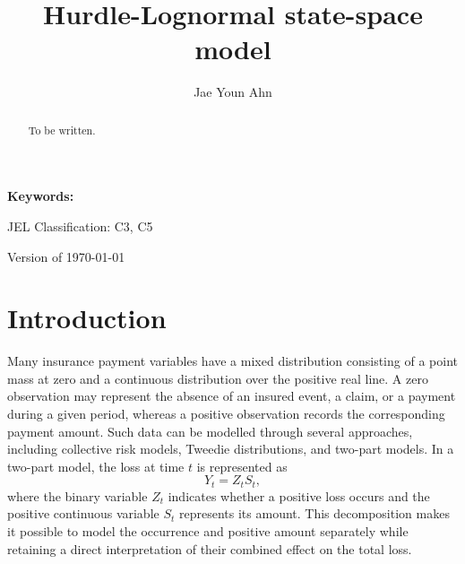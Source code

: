\documentclass[11pt,authoryear]{elsarticle}
\theoremstyle{nopunct}
\numberwithin{equation}{section}
\begin{document}
	\begin{titlepage}	
		\thispagestyle{empty}
\title{Hurdle-Lognormal state-space model}

\author{Jae Youn Ahn}%








\begin{abstract}

To be written.

\end{abstract}


\maketitle


\textbf{Keywords:} 


\vspace{.2cm}

JEL Classification: C3, C5


\vspace{.2cm}


Version of \today
\end{titlepage}

\newpage



\section{Introduction}

Many insurance payment variables have a mixed distribution consisting
of a point mass at zero and a continuous distribution over the positive
real line. A zero observation may represent the absence of an insured
event, a claim, or a payment during a given period, whereas a positive
observation records the corresponding payment amount. Such data can be
modelled through several approaches, including collective risk models,
Tweedie distributions, and two-part models. In a two-part model, the
loss at time \(t\) is represented as
\[
Y_t=Z_tS_t,
\]
where the binary variable \(Z_t\) indicates whether a positive loss
occurs and the positive continuous variable \(S_t\) represents its
amount. This decomposition makes it possible to model the occurrence
and positive amount separately while retaining a direct interpretation
of their combined effect on the total loss.
\end{document}
